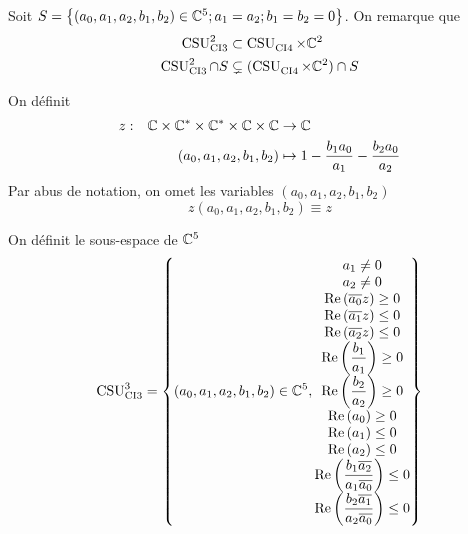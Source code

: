   Soit \(S = \left\lbrace (a_0,a_1,a_2,b_1,b_2) \in \CC^5 ; a_1 = a_2 ; b_1 = b_2 = 0 \right\rbrace \). On remarque que
  \begin{align}
    \CSU[2]{CI3} & \subset \CSU{CI4}\times\CC^2
    \\
    \CSU[2]{CI3}\cap S & \subsetneq (\CSU{CI4}\times\CC^2)\cap S 
  \end{align}

    On définit 
    \begin{equation}
      \label{eq:fonction:z-ci3}
      \fonction{z}{\CC\times\CC^*\times\CC^*\times \CC \times \CC}{\CC}%
        {(a_0,a_1,a_2,b_1,b_2)}{1 - \frac{b_1a_0}{a_1} - \frac{b_2a_0}{a_2}}
    \end{equation}
    Par abus de notation, on omet les variables \( (a_0,a_1,a_2,b_1,b_2)\)
    \begin{equation}
       z(a_0,a_1,a_2,b_1,b_2) \equiv z
    \end{equation}
  \begin{defn}
    \label{def:csu:ci3-3}

    On définit le sous-espace  de \(\CC^5\)
    \begin{equation*}
      \CSU[3]{CI3} = \left\lbrace
      (a_0,a_1,a_2,b_1,b_2) \in \CC^5,
      \begin{matrix}
        a_1 \not = 0
        \\
        a_2 \not = 0
        \\
        \Re\left(\conj{a_0}z\right) \ge 0
        \\
        \Re\left(\conj{a_1}z\right) \le 0
        \\
        \Re\left(\conj{a_2}z\right) \le 0
        \\
        \Re\left(\frac{b_1}{a_1}\right) \ge 0
        \\
        \Re\left(\frac{b_2}{a_2}\right) \ge 0
        \\
        \Re\left(a_0\right) \ge 0
        \\
        \Re\left(a_1\right) \le 0
        \\
        \Re\left(a_2\right) \le 0
        \\
        \Re\left(\frac{b_1\conj{a_2}}{a_1\conj{a_0}}\right) \le 0
        \\
        \Re\left(\frac{b_2\conj{a_1}}{a_2\conj{a_0}}\right) \le 0
      \end{matrix}
      \right\rbrace
    \end{equation*}
  \end{defn}

